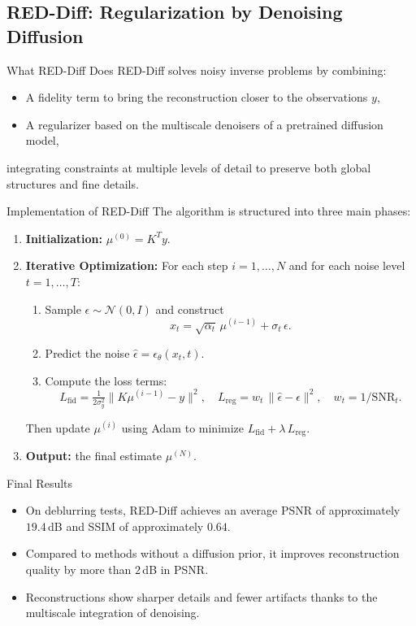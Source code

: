 
\subsection{RED-Diff: Regularization by Denoising Diffusion}

\begin{frame}{What RED-Diff Does}
  RED-Diff solves noisy inverse problems by combining:
  \begin{itemize}
    \item A fidelity term to bring the reconstruction closer to the observations $y$,
    \item A regularizer based on the multiscale denoisers of a pretrained diffusion model,
  \end{itemize}
  integrating constraints at multiple levels of detail to preserve both global structures and fine details.
\end{frame}

\begin{frame}[fragile]{Implementation of RED-Diff}
  The algorithm is structured into three main phases:
  \begin{enumerate}
    \item \textbf{Initialization:} $\mu^{(0)} = K^T y$.
    \item \textbf{Iterative Optimization:}
      For each step $i=1,\dots,N$ and for each noise level $t=1,\dots,T$:
      \begin{enumerate}
        \item Sample $\epsilon\sim\mathcal{N}(0,I)$ and construct
          \[x_t = \sqrt{\alpha_t}\,\mu^{(i-1)} + \sigma_t\,\epsilon.\]
        \item Predict the noise $\hat\epsilon = \epsilon_\theta(x_t,t)$.
        \item Compute the loss terms:
          \[
            L_{\mathrm{fid}} = \tfrac{1}{2\sigma_y^2}\|K\mu^{(i-1)} - y\|^2,
            \quad
            L_{\mathrm{reg}} = w_t\,\|\hat\epsilon - \epsilon\|^2,
            \quad w_t = 1/\mathrm{SNR}_t.
          \]
      \end{enumerate}
      Then update $\mu^{(i)}$ using Adam to minimize $L_{\mathrm{fid}} + \lambda\,L_{\mathrm{reg}}$.
    \item \textbf{Output:} the final estimate $\mu^{(N)}$.
  \end{enumerate}
\end{frame}

\begin{frame}{Final Results}
  \begin{itemize}
    \item On deblurring tests, RED-Diff achieves an average PSNR of approximately $19.4\,$dB and SSIM of approximately $0.64$.
    \item Compared to methods without a diffusion prior, it improves reconstruction quality by more than $2\,$dB in PSNR.
    \item Reconstructions show sharper details and fewer artifacts thanks to the multiscale integration of denoising.
  \end{itemize}
\end{frame}
